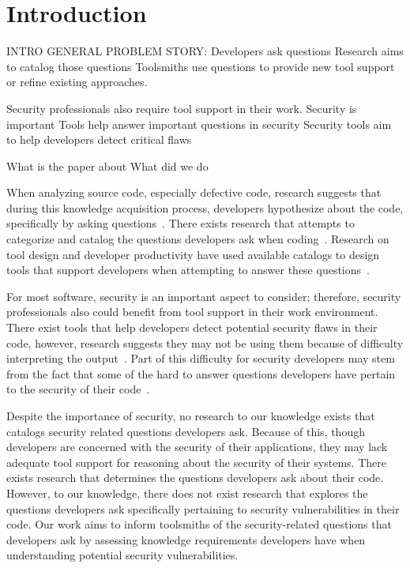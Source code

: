 \documentclass[conference]{IEEEtran}
\begin{document}
\section{Introduction}


INTRO GENERAL PROBLEM STORY:
Developers ask questions
Research aims to catalog those questions
Toolsmiths use questions to provide new tool support or refine existing approaches.

Security professionals also require tool support in their work.
Security is important
Tools help answer important questions in security 
Security tools aim to help developers detect critical flaws

What is the paper about
	What did we do


When analyzing source code, especially defective code, research suggests that during this knowledge acquisition process, developers hypothesize about the code, specifically by asking questions~\cite{latoza2010hard, ko2004designing}. There exists research that attempts to categorize and catalog the questions developers ask when coding~\cite{latoza2010hard}. Research on tool design and developer productivity have used available catalogs to design tools that support developers when attempting to answer these questions~\cite{yoon2013visualization, servant2012history}.

 
For most software, security is an important aspect to consider; therefore, security professionals also could benefit from tool support in their work environment. There exist tools that help developers detect potential security flaws in their code, however, research suggests they may not be using them because of difficulty interpreting the output~\cite{johnson2013don}. Part of this difficulty for security developers may stem from the fact that some of the hard to answer questions developers have pertain to the security of their code~\cite{latoza2010hard}.

Despite the importance of security, no research to our knowledge exists that catalogs security related questions developers ask. Because of this, though developers are concerned with the security of their applications, they may lack adequate tool support for reasoning about the security of their systems. There exists research that determines the questions developers ask about their code. However, to our knowledge, there does not exist research that explores the questions developers ask specifically pertaining to security vulnerabilities in their code. Our work aims to inform toolsmiths of the security-related questions that developers ask by assessing knowledge requirements developers have when understanding potential security vulnerabilities.
\end{document}
